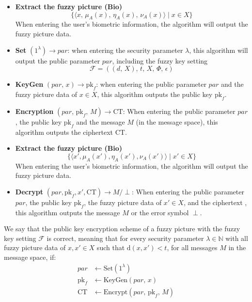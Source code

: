 \documentclass[graybox]{svmult}
\begin{document}
\begin{itemize}
    \item \textbf{Extract the fuzzy picture (Bio)}
          \[
              \{ \langle x,\, \mu_A(x),\, \eta_A(x),\, \nu_A(x) \rangle \mid x \in X \}
          \]
          When entering the user's biometric information, the algorithm will output the fuzzy picture data.

    \item \textbf{Set} \( (1^\lambda) \to par  \): when entering the security parameter \( \lambda \), this algorithm will output the public parameter \(  par \), including the fuzzy key setting
          \[
              \mathcal{F} = ((d, \, X), \, t, \, X, \, \varPhi, \, \epsilon)
          \]

    \item \textbf{KeyGen} \( (par ,\, x) \to \text{pk}_f \): when entering the public parameter \(  par \) and the fuzzy picture data of \( x \in X \), this algorithm outputs the public key \( \text{pk}_f \).

    \item \textbf{Encryption} \( (par ,\, \text{pk}_f,\, M) \to \text{CT} \): When entering the public parameter \(  par \), the public key \( \text{pk}_f \) and the message \( M \) (in the message space), this algorithm outputs the ciphertext \( \text{CT} \).

    \item \textbf{Extract the fuzzy picture (Bio)}
          \[
              \{ \langle x', \mu_A(x'), \eta_A(x'), \nu_A(x') \rangle \mid x' \in X \}
          \]
          When entering the user's biometric information, the algorithm will output the fuzzy picture data.

    \item \textbf{Decrypt} \( (par , \text{pk}_f, x', \text{CT}) \to M/\perp \): When entering the public parameter \(  par \), the public key \( \text{pk}_f \), the fuzzy picture data of \( x' \in X \), and the ciphertext , this algorithm outputs the message \( M \) or the error symbol \( \perp \).

\end{itemize}

We say that the public key encryption scheme of a fuzzy picture with the fuzzy key setting \( \mathcal{F} \) is correct, meaning that for every security parameter \( \lambda \in \mathbb{N} \) with all fuzzy picture data of \( x, x' \in X \) such that \( \mathrm{d}(x, x') < t \), for all messages \( M \) in the \allowbreak message space, if:
\begin{align*}
    par         & \leftarrow \text{Set}(1^\lambda)                    \\[6pt]
    \text{pk}_f & \leftarrow \text{KeyGen}(par ,\, x)                 \\[6pt]
    \text{CT}   & \leftarrow \text{Encrypt}(par ,\, \text{pk}_f,\, M)
\end{align*}
\end{document}
